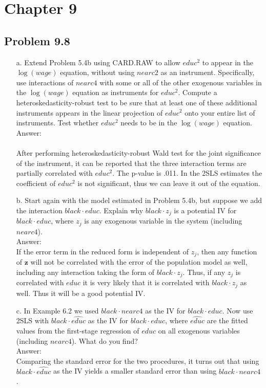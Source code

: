 \documentclass[10pt]{article}
\begin{document}
\section*{Chapter 9}
\subsection*{Problem 9.8}
\begin{enumerate}
\item[a.] Extend Problem 5.4b using CARD.RAW to allow $educ^2$ to appear in the $\log(wage)$ equation, without using $nearc2$ as an instrument. Specifically, use interactions of $nearc4$ with some or all of the other exogenous variables in the $\log(wage)$ equation as instruments for $educ^2$. Compute a heteroskedasticity-robust test to be sure that at least one of these additional instruments appears in the linear projection of $educ^2$ onto your entire list of instruments. Test whether $educ^2$ needs to be in the $\log(wage)$ equation. 
\\ Answer:\\ \\

After performing heteroskedasticity-robust Wald test for the joint significance of the instrument, it can be reported that the three interaction terms are partially correlated with $educ^2$. The p-value is .011. In the 2SLS estimates the coefficient of $educ^2$ is not significant, thus we can leave it out of the equation.

\item[b.] Start again with the model estimated in Problem 5.4b, but suppose we add the interaction $black\cdot educ$. Explain why $black\cdot z_j$ is a potential IV for $black\cdot educ$, where $z_j$ is any exogenous variable in the system (including $nearc4$). 
\\ Answer:\\

If the error term in the reduced form is independent of $z_j$, then any function of $\textbf{z}$ will not be correlated with the error of the population model as well, including any interaction taking the form of $black\cdot z_j$. Thus, if any $z_j$ is correlated with $educ$ it is very likely that it is correlated with $black\cdot z_j$ as well. Thus it will be a good potential IV.

\item[c.] In Example 6.2 we used $black\cdot nearc4$ as the IV for $black\cdot educ$. Now use 2SLS with $black\cdot\hat{educ}$ as the IV for $black\cdot educ$, where $\hat{educ}$ are the fitted values from the first-stage regression of $educ$ on all exogenous variables (including $nearc4$). What do you find? 
\\ Answer:\\

Comparing the standard error for the two procedures, it turns out that using $black\cdot\hat{educ}$ as the IV yields a smaller standard error than using $black\cdot nearc4$.


\end{enumerate}
\end{document}
